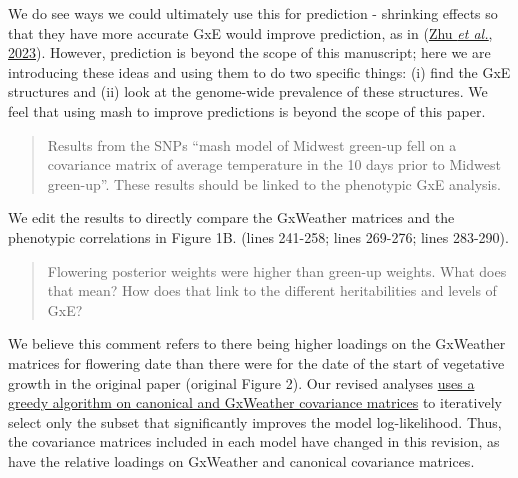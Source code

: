 \documentclass[
  letterpaper,
  DIV=11,
  numbers=noendperiod]{scrartcl}
\begin{document}
We do see ways we could ultimately use this for prediction - shrinking
effects so that they have more accurate GxE would improve prediction, as
in (\href{https://doi.org/10.1016/j.xgen.2023.100297}{Zhu \emph{et al.},
2023}). However, prediction is beyond the scope of this manuscript; here
we are introducing these ideas and using them to do two specific things:
(i) find the GxE structures and (ii) look at the genome-wide prevalence
of these structures. We feel that using mash to improve predictions is
beyond the scope of this paper.

\begin{quote}
\begin{tcolorbox}[enhanced jigsaw, colframe=quarto-callout-warning-color-frame, rightrule=.15mm, leftrule=.75mm, left=2mm, breakable, toprule=.15mm, arc=.35mm, bottomrule=.15mm, opacityback=0, colback=white]

Results from the SNPs ``mash model of Midwest green-up fell on a
covariance matrix of average temperature in the 10 days prior to Midwest
green-up''. These results should be linked to the phenotypic GxE
analysis.

\end{tcolorbox}
\end{quote}

We edit the results to directly compare the GxWeather matrices and the
phenotypic correlations in Figure 1B. (lines 241-258; lines 269-276;
lines 283-290).

\begin{quote}
\begin{tcolorbox}[enhanced jigsaw, colframe=quarto-callout-warning-color-frame, rightrule=.15mm, leftrule=.75mm, left=2mm, breakable, toprule=.15mm, arc=.35mm, bottomrule=.15mm, opacityback=0, colback=white]

Flowering posterior weights were higher than green-up weights. What does
that mean? How does that link to the different heritabilities and levels
of GxE?

\end{tcolorbox}
\end{quote}

We believe this comment refers to there being higher loadings on the
GxWeather matrices for flowering date than there were for the date of
the start of vegetative growth in the original paper (original Figure
2). Our revised analyses \hyperref[fig-greedy]{uses a greedy algorithm
on canonical and GxWeather covariance matrices} to iteratively select
only the subset that significantly improves the model log-likelihood.
Thus, the covariance matrices included in each model have changed in
this revision, as have the relative loadings on GxWeather and canonical
covariance matrices.
\end{document}
